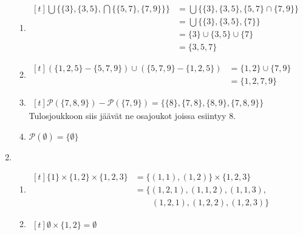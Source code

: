 \documentclass[a4paper,11pt,draft]{article}
\begin{document}
\begin{enumerate}
\begin{enumerate}
  \item
    \begin{math}
      \begin{aligned}[t]
        \bigcup\{\{3\},\{3,5\},\bigcap\{\{5,7\},\{7,9\}\}\}
        &= \bigcup\{\{3\},\{3,5\},\{5,7\} \cap \{7,9\}\} \\
        &= \bigcup\{\{3\},\{3,5\},\{7\}\} \\
        &= \{3\} \cup \{3,5\} \cup \{7\} \\
        &= \{3,5,7\}
      \end{aligned}
    \end{math}

  \item
    \begin{math}
      \begin{aligned}[t]
        (\{1,2,5\} - \{5,7,9\}) \cup (\{5,7,9\} - \{1,2,5\})
        &= \{1,2\} \cup \{7,9\} \\
        &= \{1,2,7,9\}
      \end{aligned}
    \end{math}

  \item
    \begin{math}
      \begin{aligned}[t]
        \mathcal{P}(\{7,8,9\}) - \mathcal{P}(\{7,9\})
        = \{\{8\}, \{7,8\}, \{8,9\}, \{7,8,9\}\}
      \end{aligned}
    \end{math} \\
    Tulosjoukkoon siis jäävät ne osajoukot joissa esiintyy 8.
  \item
    $\mathcal{P}(\emptyset) = \{\emptyset\}$
  \end{enumerate}

\item
  \begin{enumerate}
  \item
    \begin{math}
      \begin{aligned}[t]
        \{1\} \times \{1,2\} \times \{1,2,3\}
        &= \{(1,1), (1,2)\} \times \{1,2,3\} \\
        &= \{(1,2,1), (1,1,2), (1,1,3),\\
        &\qquad(1,2,1), (1,2,2), (1,2,3)\}
      \end{aligned}
    \end{math}

  \item
    \begin{math}
      \begin{aligned}[t]
        \emptyset \times \{1,2\} = \emptyset
      \end{aligned}
    \end{math}


\end{enumerate}
\end{enumerate}
\end{document}
